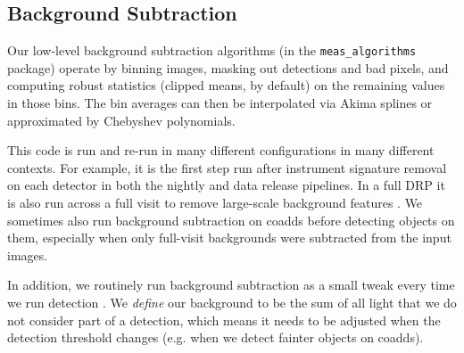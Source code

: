 \subsection{Background Subtraction}
\label{sec:backgrounds}

Our low-level background subtraction algorithms (in the \texttt{meas\_algorithms} package) operate by binning images, masking out detections and bad pixels, and computing robust statistics (clipped means, by default) on the remaining values in those bins.
The bin averages can then be interpolated via Akima splines or approximated by Chebyshev polynomials.

This code is run and re-run in many different configurations in many different contexts.
For example, it is the first step run after instrument signature removal  on each detector in both the nightly and data release pipelines.
In a full DRP it is also run across a full visit to remove large-scale background features \citep{2019PASJ...71..114A}.
We sometimes also run background subtraction on coadds before detecting objects on them, especially when only full-visit backgrounds were subtracted from the input images.

In addition, we routinely run background subtraction as a small tweak every time we run detection .
We \emph{define} our background to be the sum of all light that we do not consider part of a detection, which means it needs to be adjusted when the detection threshold changes (e.g. when we detect fainter objects on coadds).
